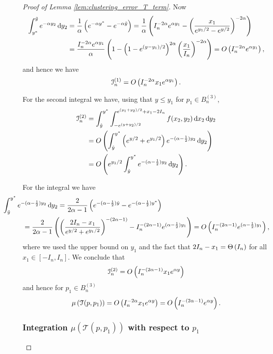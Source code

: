 \begin{proof}[Proof of Lemma \ref{lem:clustering_error_T_term}]
Now 
\begin{align*}
	\int_{y^\ast}^{\tilde{y}}  e^{-\alpha y_2} \operatorname{\mathrm{d}\hspace{-2pt}} y_2 
	&= \frac{1}{\alpha}\left(e^{-\alpha y^\ast} - e^{-\alpha \tilde{y}}\right) 
		= \frac{1}{\alpha}\left(I_n^{-2\alpha} e^{\alpha y_1} 
		- \left(\frac{x_1}{e^{y_1/2} - e^{y/2}}\right)^{-2\alpha}\right) \\
	&= \frac{I_n^{-2\alpha} e^{\alpha y_1}}{\alpha}\left(1 - \left(1 - e^{(y - y_1)/2}\right)^{2\alpha}
		\left(\frac{x_1}{I_n}\right)^{-2\alpha}\right) = O\left(I_n^{-2\alpha} e^{\alpha y_1}\right),
\end{align*}
and hence we have
\[
	\mathcal{I}_n^{(1)} = O\left(I_n^{-2\alpha} x_1 e^{\alpha y_1}\right).
\]

For the second integral we have, using that $y \le y_1$ for $p_1 \in B_n^{(3)}$,
\begin{align*}
	\mathcal{I}_n^{(2)} &= \int_{\hat{y}}^{y^\ast} \int_{-e^{(y+y_2)/2}}^{e^{(y_1 + y_2)/2} + x_1 - 2I_n} 
		f(x_2,y_2)\operatorname{\mathrm{d}\hspace{-2pt}} x_2 \operatorname{\mathrm{d}\hspace{-2pt}} y_2\\
	&= O\left(\int_{\hat{y}}^{y^\ast} \left(e^{y/2} + e^{y_1/2}\right)e^{-(\alpha - \frac{1}{2})y_2} \operatorname{\mathrm{d}\hspace{-2pt}} y_2\right)\\
	&= O\left( e^{y_1/2} \int_{\hat{y}}^{y^\ast}e^{-(\alpha - \frac{1}{2})y_2} \operatorname{\mathrm{d}\hspace{-2pt}} y_2\right).
\end{align*}

For the integral we have
\begin{align*}
	&\hspace{-30pt}\int_{\hat{y}}^{y^\ast}e^{-(\alpha - \frac{1}{2})y_2} \dd y_2
		= \frac{2}{2\alpha - 1} \left(e^{-(\alpha - \frac{1}{2})\hat{y}} - e^{-(\alpha - \frac{1}{2})y^\ast}\right)\\
	&= \frac{2}{2\alpha - 1}\left(\left(\frac{2I_n - x_1}{e^{y/2} + e^{y_1/2}}\right)^{-(2\alpha - 1)} 
		- I_n^{-(2\alpha - 1)} e^{(\alpha - \frac{1}{2})y_1}\right) = \bigO{I_n^{-(2\alpha-1)} e^{(\alpha - \frac{1}{2})y_1}},
\end{align*}
where we used the upper bound on $y_1$ and the fact that $2I_n - x_1 = \Theta\left(I_n\right)$ for all $x_1 \in [-I_n,I_n]$. We conclude that
\[
	\mathcal{I}_n^{(2)} = O\left(I_n^{-(2\alpha-1)} x_1 e^{\alpha y}\right)
\]
and hence for $p_1 \in B_n^{(3)}$
\[
	\mu\left(\mathcal{T}(p,p_1)\right) = O\left(I_n^{-2\alpha} x_1 e^{\alpha y}\right)
	= O\left(I_n^{-(2\alpha - 1)} e^{\alpha y}\right).
\]

\subsubsection*{Integration $\mu(\mathcal{T}(p,p_1))$ with respect to $p_1$}




\end{proof}
